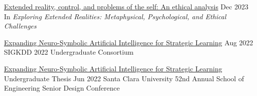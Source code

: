 \vspace{\sectionpadding}
\entry
    {\href{https://www.routledge.com/Exploring-Extended-Realities-Metaphysical-Psychological-and-Ethical-Challenges/Kissel-Ramirez/p/book/9781032417325}{Extended reality, control, and problems of the self: An ethical analysis}}
    {}
    {Dec 2023}
    {In \textit{Exploring Extended Realities: Metaphysical, Psychological, and Ethical Challenges}}

\entry
    {\href{https://kdd.org/kdd2022/papers/17_Dorian\%20Clay.pdf}{Expanding Neuro-Symbolic Artificial Intelligence for Strategic Learning}}
    {}
    {Aug 2022}
    {SIGKDD 2022 Undergraduate Consortium}

\entry
    {\href{https://scholarcommons.scu.edu/cseng_senior/228}{Expanding Neuro-Symbolic Artificial Intelligence for Strategic Learning}}
    {Undergraduate Thesis}
    {Jun 2022}
    {Santa Clara University 52nd Annual School of Engineering Senior Design Conference}
